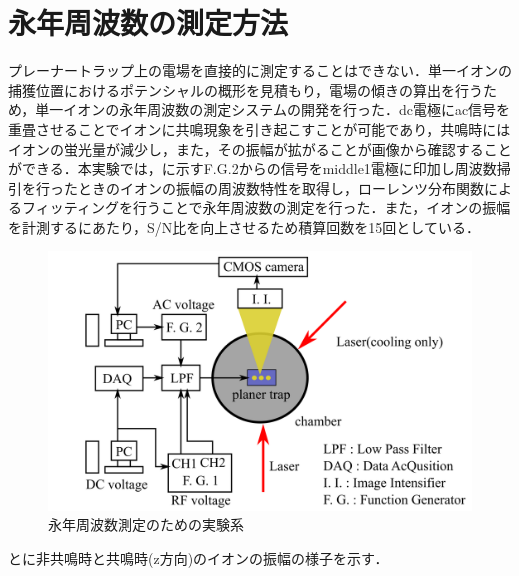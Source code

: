 \section{永年周波数の測定方法} \label{MeasSecFreq_Method}
プレーナートラップ上の電場を直接的に測定することはできない．単一イオンの捕獲位置におけるポテンシャルの概形を見積もり，電場の傾きの算出を行うため，単一イオンの永年周波数の測定システムの開発を行った．dc電極にac信号を重畳させることでイオンに共鳴現象を引き起こすことが可能であり，共鳴時にはイオンの蛍光量が減少し，また，その振幅が拡がることが画像から確認することができる．本実験では，に示すF.G.2からの信号をmiddle1電極に印加し周波数掃引を行ったときのイオンの振幅の周波数特性を取得し，ローレンツ分布関数によるフィッティングを行うことで永年周波数の測定を行った．また，イオンの振幅を計測するにあたり，S/N比を向上させるため積算回数を15回としている．

\begin{figure}[h]
	\centering
	\includegraphics[width = 0.6\linewidth]{./methods/figure/SecularFreqMeasSetup.png}
	\caption{永年周波数測定のための実験系}
	\label{fig:MeasSec_System}
\end{figure}

とに非共鳴時と共鳴時(z方向)のイオンの振幅の様子を示す．

